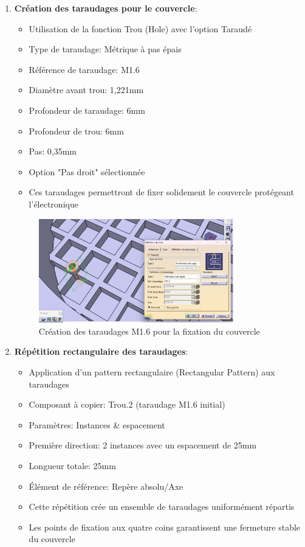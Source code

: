 \documentclass[a4paper,12pt]{report}
\begin{document}
\begin{enumerate}
    \item \textbf{Création des taraudages pour le couvercle}:
    \begin{itemize}
        \item Utilisation de la fonction Trou (Hole) avec l'option Taraudé
        \item Type de taraudage: Métrique à pas épais
        \item Référence de taraudage: M1.6
        \item Diamètre avant trou: 1,221mm
        \item Profondeur de taraudage: 6mm
        \item Profondeur de trou: 6mm
        \item Pas: 0,35mm
        \item Option "Pas droit" sélectionnée
        \item Ces taraudages permettront de fixer solidement le couvercle protégeant l'électronique
    \end{itemize}
    
    \begin{figure}[H]
        \centering
        \includegraphics[width=0.8\textwidth]{images/taraudage_couvercle.png}
        \caption{Création des taraudages M1.6 pour la fixation du couvercle}
        \label{fig:taraudage_couvercle}
    \end{figure}
    
    \item \textbf{Répétition rectangulaire des taraudages}:
    \begin{itemize}
        \item Application d'un pattern rectangulaire (Rectangular Pattern) aux taraudages
        \item Composant à copier: Trou.2 (taraudage M1.6 initial)
        \item Paramètres: Instances \& espacement
        \item Première direction: 2 instances avec un espacement de 25mm
        \item Longueur totale: 25mm
        \item Élément de référence: Repère absolu/Axe
        \item Cette répétition crée un ensemble de taraudages uniformément répartis
        \item Les points de fixation aux quatre coins garantissent une fermeture stable du couvercle
    \end{itemize}
    

\end{enumerate}
\end{document}
